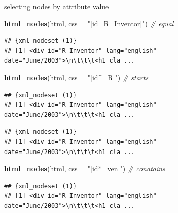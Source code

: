 \documentclass[ignorenonframetext,]{beamer}
\newenvironment{Shaded}{\begin{snugshade}}{\end{snugshade}}
\newcommand{\KeywordTok}[1]{\textcolor[rgb]{0.13,0.29,0.53}{\textbf{{#1}}}}
\newcommand{\DataTypeTok}[1]{\textcolor[rgb]{0.13,0.29,0.53}{{#1}}}
\newcommand{\StringTok}[1]{\textcolor[rgb]{0.31,0.60,0.02}{{#1}}}
\newcommand{\CommentTok}[1]{\textcolor[rgb]{0.56,0.35,0.01}{\textit{{#1}}}}
\newcommand{\NormalTok}[1]{{#1}}
\begin{document}
\begin{frame}[fragile]{selecting nodes by attribute value}

\begin{Shaded}
\begin{Highlighting}[]
\KeywordTok{html_nodes}\NormalTok{(html, }\DataTypeTok{css =} \StringTok{"[id=R_Inventor]"}\NormalTok{) }\CommentTok{# equal}
\end{Highlighting}
\end{Shaded}

\begin{verbatim}
## {xml_nodeset (1)}
## [1] <div id="R_Inventor" lang="english" date="June/2003">\n\t\t\t<h1 cla ...
\end{verbatim}

\begin{Shaded}
\begin{Highlighting}[]
\KeywordTok{html_nodes}\NormalTok{(html, }\DataTypeTok{css =} \StringTok{"[id^=R]"}\NormalTok{)         }\CommentTok{# starts }
\end{Highlighting}
\end{Shaded}

\begin{verbatim}
## {xml_nodeset (1)}
## [1] <div id="R_Inventor" lang="english" date="June/2003">\n\t\t\t<h1 cla ...
\end{verbatim}

\begin{Shaded}
\end{Shaded}

\begin{verbatim}
## {xml_nodeset (1)}
## [1] <div id="R_Inventor" lang="english" date="June/2003">\n\t\t\t<h1 cla ...
\end{verbatim}

\begin{Shaded}
\begin{Highlighting}[]
\KeywordTok{html_nodes}\NormalTok{(html, }\DataTypeTok{css =} \StringTok{"[id*=ven]"}\NormalTok{)       }\CommentTok{# conatains}
\end{Highlighting}
\end{Shaded}

\begin{verbatim}
## {xml_nodeset (1)}
## [1] <div id="R_Inventor" lang="english" date="June/2003">\n\t\t\t<h1 cla ...
\end{verbatim}

\end{frame}
\end{document}

